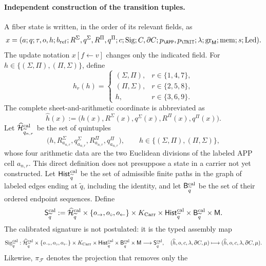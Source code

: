 \paragraph{Independent construction of the transition tuples.}
A fiber state is written, in the order of its relevant fields, as
\[
 x=(a;q;\tau,o,h;b_{\rm ref};
       R^\Sigma,q^\Sigma,R^\Pi,q^\Pi;c;
       \operatorname{Sig};C,\partial C;p_{\APP},p_{\TRIT};
       \lambda;\operatorname{gr}_{\mathsf M};\operatorname{mem};
       s;\operatorname{Led}).
\]
The update notation \(x[f\leftarrow v]\) changes only the indicated field.
For \(h\in\{(\Sigma,\Pi),(\Pi,\Sigma)\}\), define
\[
 h_r(h)=
 \begin{cases}
  (\Sigma,\Pi),&r\in\{1,4,7\},\\
  (\Pi,\Sigma),&r\in\{2,5,8\},\\
 h,&r\in\{3,6,9\}.
 \end{cases}
\]
The complete sheet-and-arithmetic coordinate is abbreviated as
\[
 \widehat h(x):=
 \bigl(h(x),R^\Sigma(x),q^\Sigma(x),R^\Pi(x),q^\Pi(x)\bigr).
\]
Let \(\widehat{\mathcal H}^{\rm cal}_{\widetilde q_{n,r}}\) be the set of
quintuples
\[
 \bigl(h,R^\Sigma_{a_{n,r}},q^\Sigma_{a_{n,r}},
          R^\Pi_{a_{n,r}},q^\Pi_{a_{n,r}}\bigr),
 \qquad
 h\in\{(\Sigma,\Pi),(\Pi,\Sigma)\},
\]
whose four arithmetic data are the two Euclidean divisions of the labeled APP
cell \(a_{n,r}\). This direct definition does not presuppose a state in a
carrier not yet constructed. Let
\(\mathsf{Hist}^{\rm cal}_{\widetilde q}\) be the set of admissible finite
paths in the graph of labeled edges ending at \(\widetilde q\), including the
identity, and let \(\mathsf B^{\rm cal}_{\widetilde q}\) be the set of their
ordered endpoint sequences. Define
\[
 \mathsf S^{\rm cal}_{\widetilde q}:=
 \widehat{\mathcal H}^{\rm cal}_{\widetilde q}
 \times\{o_{\rightarrow},o_{\circ},o_{\leftarrow}\}
 \times K_{\rm Carr}\times
 \mathsf{Hist}^{\rm cal}_{\widetilde q}\times
 \mathsf B^{\rm cal}_{\widetilde q}\times\mathsf M .
\]
The calibrated signature is not postulated: it is the typed assembly map
\[
 \operatorname{Sig}^{\rm cal}_{\widetilde q}:
 \widehat{\mathcal H}^{\rm cal}_{\widetilde q}
 \times\{o_{\rightarrow},o_{\circ},o_{\leftarrow}\}
 \times K_{\rm Carr}\times
 \mathsf{Hist}^{\rm cal}_{\widetilde q}\times
 \mathsf B^{\rm cal}_{\widetilde q}\times\mathsf M
 \longrightarrow\mathsf S^{\rm cal}_{\widetilde q},
\quad
 (\widehat h,o,c,\lambda,\partial C,\mu)
 \longmapsto(\widehat h,o,c,\lambda,\partial C,\mu).
\]
Likewise, \(\pi_{\mathcal F}\) denotes the projection that removes only the
